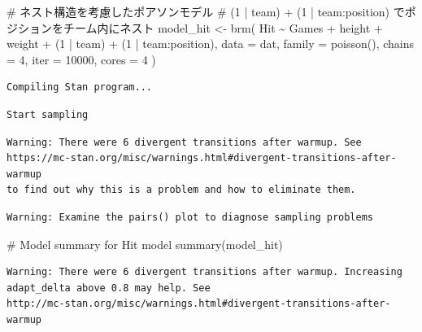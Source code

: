 \documentclass[
  a4paper,
]{ltjsbook}
\newenvironment{Shaded}{\begin{snugshade}}{\end{snugshade}}
\newcommand{\AttributeTok}[1]{\textcolor[rgb]{0.40,0.45,0.13}{#1}}
\newcommand{\CommentTok}[1]{\textcolor[rgb]{0.37,0.37,0.37}{#1}}
\newcommand{\DecValTok}[1]{\textcolor[rgb]{0.68,0.00,0.00}{#1}}
\newcommand{\FunctionTok}[1]{\textcolor[rgb]{0.28,0.35,0.67}{#1}}
\newcommand{\NormalTok}[1]{\textcolor[rgb]{0.00,0.23,0.31}{#1}}
\newcommand{\OtherTok}[1]{\textcolor[rgb]{0.00,0.23,0.31}{#1}}
\newcommand{\SpecialCharTok}[1]{\textcolor[rgb]{0.37,0.37,0.37}{#1}}
\begin{document}
\begin{Shaded}
\begin{Highlighting}[]
\CommentTok{\# ネスト構造を考慮したポアソンモデル}
\CommentTok{\# (1 | team) + (1 | team:position) でポジションをチーム内にネスト}
\NormalTok{model\_hit }\OtherTok{\textless{}{-}} \FunctionTok{brm}\NormalTok{(}
\NormalTok{    Hit }\SpecialCharTok{\textasciitilde{}}\NormalTok{ Games }\SpecialCharTok{+}\NormalTok{ height }\SpecialCharTok{+}\NormalTok{ weight }\SpecialCharTok{+}\NormalTok{ (}\DecValTok{1} \SpecialCharTok{|}\NormalTok{ team) }\SpecialCharTok{+}\NormalTok{ (}\DecValTok{1} \SpecialCharTok{|}\NormalTok{ team}\SpecialCharTok{:}\NormalTok{position),}
    \AttributeTok{data =}\NormalTok{ dat,}
    \AttributeTok{family =} \FunctionTok{poisson}\NormalTok{(),}
    \AttributeTok{chains =} \DecValTok{4}\NormalTok{,}
    \AttributeTok{iter =} \DecValTok{10000}\NormalTok{,}
    \AttributeTok{cores =} \DecValTok{4}
\NormalTok{)}
\end{Highlighting}
\end{Shaded}

\begin{verbatim}
Compiling Stan program...
\end{verbatim}

\begin{verbatim}
Start sampling
\end{verbatim}

\begin{verbatim}
Warning: There were 6 divergent transitions after warmup. See
https://mc-stan.org/misc/warnings.html#divergent-transitions-after-warmup
to find out why this is a problem and how to eliminate them.
\end{verbatim}

\begin{verbatim}
Warning: Examine the pairs() plot to diagnose sampling problems
\end{verbatim}

\begin{Shaded}
\begin{Highlighting}[]
\CommentTok{\# Model summary for Hit model}
\FunctionTok{summary}\NormalTok{(model\_hit)}
\end{Highlighting}
\end{Shaded}

\begin{verbatim}
Warning: There were 6 divergent transitions after warmup. Increasing
adapt_delta above 0.8 may help. See
http://mc-stan.org/misc/warnings.html#divergent-transitions-after-warmup
\end{verbatim}
\end{document}
